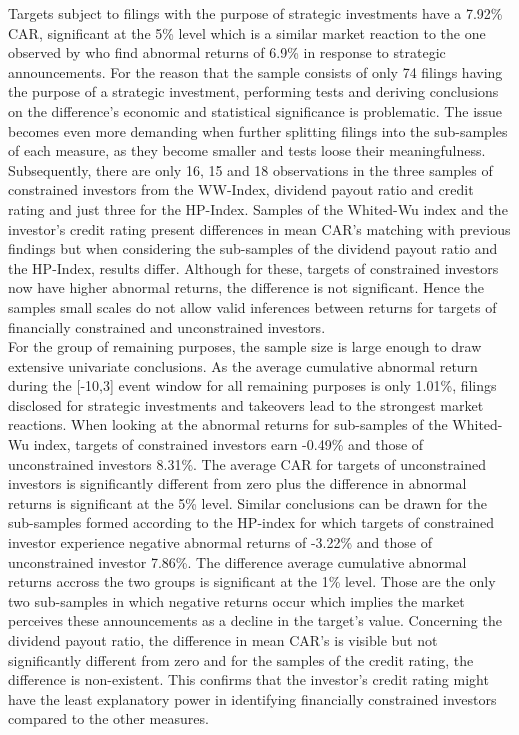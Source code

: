 \documentclass[12pt]{article}
\begin{document}
\noindent Targets subject to filings with the purpose of strategic investments have a 7.92\% CAR, significant at the 5\% level which is a similar market reaction to the one observed by \citet[p.]{Allen2000} who find abnormal returns of 6.9\% in response to strategic announcements. For the reason that the sample consists of only 74 filings having the purpose of a strategic investment, performing tests and deriving conclusions on the difference's economic and statistical significance is problematic. The issue becomes even more demanding when  further splitting filings into the sub-samples of each measure, as they become smaller and tests loose their meaningfulness. Subsequently, there are only 16, 15 and 18 observations in the three samples of constrained investors from the WW-Index, dividend payout ratio and credit rating and just three for the HP-Index. Samples of the Whited-Wu index and the investor's credit rating present differences in mean CAR's matching with previous findings but when considering the sub-samples of the dividend payout ratio and the HP-Index, results differ. Although for these, targets of constrained investors now have higher abnormal returns, the difference is not significant. Hence the samples small scales do not allow valid inferences between returns for targets of financially constrained and unconstrained investors.\\
For the group of remaining purposes, the sample size is large enough to draw extensive univariate conclusions. As the average cumulative abnormal return during the [-10,3] event window for all remaining purposes is only 1.01\%,  filings disclosed for strategic investments and takeovers lead to the strongest market reactions. When looking at the abnormal returns for sub-samples of the Whited-Wu index, targets of constrained investors earn -0.49\% and those of unconstrained investors 8.31\%. The average CAR for targets of unconstrained investors is significantly different from zero plus the difference in abnormal returns is significant at the 5\% level. Similar conclusions can be drawn for the sub-samples formed according to the HP-index for which targets of constrained investor experience negative abnormal returns of -3.22\% and those of unconstrained investor 7.86\%. The difference average cumulative abnormal returns accross the two groups is significant at the 1\% level. Those are the only two sub-samples in which negative returns occur which implies the market perceives these announcements as a decline in the target's value.
Concerning the dividend payout ratio, the difference in mean CAR's is visible but not significantly different from zero and for the samples of the credit rating, the difference is non-existent. This confirms that the investor's credit rating might have the least explanatory power in identifying financially constrained investors compared to the other measures. 
\end{document}
